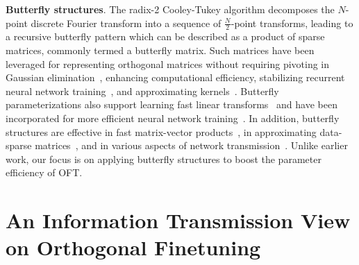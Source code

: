 \textbf{Butterfly structures}. The radix-2 Cooley-Tukey algorithm decomposes the $N$-point discrete Fourier transform into a sequence of $\frac{N}{2}$-point transforms, leading to a recursive butterfly pattern which can be described as a product of sparse matrices, commonly termed a butterfly matrix. Such matrices have been leveraged for representing orthogonal matrices without requiring pivoting in Gaussian elimination~\cite{parker1995random}, enhancing computational efficiency, stabilizing recurrent neural network training~\cite{jing2017tunable}, and approximating kernels~\cite{munkhoeva2018quadrature}. Butterfly parameterizations also support learning fast linear transforms~\cite{dao2019learning,dao2019kaleidoscope} and have been incorporated for more efficient neural network training~\cite{chen2022pixelated,dao2022monarch}. In addition, butterfly structures are effective in fast matrix-vector products~\cite{michielssen1996multilevel,o2010algorithm}, in approximating data-sparse matrices~\cite{li2015butterfly}, and in various aspects of network transmission~\cite{klasing1994broadcasting,li2003linear,rajasingh2016transmission}. Unlike earlier work, our focus is on applying butterfly structures to boost the parameter efficiency of OFT.

\section{An Information Transmission View on Orthogonal Finetuning}

